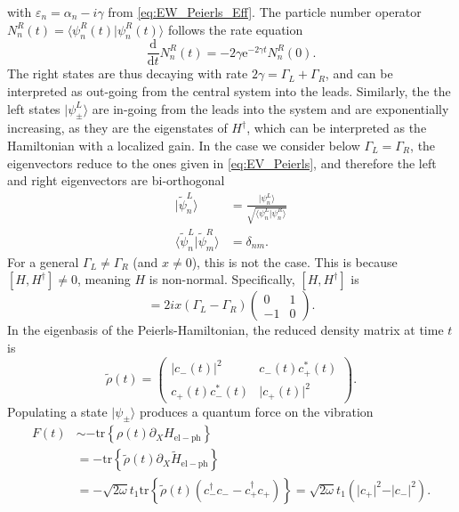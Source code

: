 \documentclass{article}
\newcommand{\exP}[1]{\mathrm{e}^{#1}}
\newcommand{\dif}{\mathrm{d}}
\newcommand{\pdagger}{{\phantom{\dagger}}}
\newcommand{\tr}[1]{\mathrm{tr}\left\{#1\right\}}
\begin{document}
with $\varepsilon_n = \alpha_n -i\gamma$ from \cref{eq:EW_Peierls_Eff}.
The particle number operator $N^R_n(t) = \langle \psi^R_n(t)\vert \psi^R_n(t)\rangle$ follows the rate equation 
\begin{equation}
	\frac{\dif}{\dif t}N^R_n(t) = -2\gamma \exP{-2\gamma t}N^R_n(0).
\end{equation}
The right states are thus decaying with rate $2\gamma = \Gamma_L+\Gamma_R$, and can be interpreted as out-going from the central system into the leads. 
Similarly, the the left states $\vert \psi_\pm^L\rangle$ are in-going from the leads into the system and are exponentially increasing, as they are the eigenstates of $H^\dagger$, which can be interpreted as the Hamiltonian with a localized gain.
In the case we consider below $\Gamma_L = \Gamma_R$, the eigenvectors reduce to the ones given in \cref{eq:EV_Peierls}, and therefore the left and right eigenvectors are bi-orthogonal
\begin{align}
	\vert\tilde{\psi}_n^L\rangle &= \frac{\vert \psi_n^L\rangle}{\sqrt{\langle \psi_n^L\vert\psi_n^R \rangle}}\\
	\langle \tilde{\psi}^L_n\vert  \tilde{\psi}^R_m\rangle &= \delta_{nm}.
\end{align}  
For a general $\Gamma_L\neq \Gamma_R$ (and $x\neq 0$), this is not the case. This is because $[H,H^\dagger]\neq 0$, meaning $H$ is non-normal.
Specifically, $[H,H^\dagger]$ is
\begin{equation}
	[H,H^\dagger] = 2ix (\Gamma_L-\Gamma_R)\begin{pmatrix}
		0  & 1\\
		-1 & 0
	\end{pmatrix}.
\end{equation}
In the eigenbasis of the Peierls-Hamiltonian, the reduced density matrix at time $t$ is
\begin{equation}
	\tilde{\rho}(t) = \begin{pmatrix}
	\vert c_-(t)\vert^2 &  c_-^{\phantom{*}}(t)c_+^*(t) \\
	c_+^{\phantom{*}}(t)c_-^*(t) & \vert c_+(t)\vert^2 
	\end{pmatrix}.
\end{equation}
Populating a state $\vert\psi_\pm\rangle$ produces a quantum force on the vibration
\begin{align}
	F(t) &\sim -\tr{\rho(t)\partial_X H_\mathrm{el-ph}} \\
	&= -\tr{\tilde{\rho}(t)\partial_X \tilde{H}_\mathrm{el-ph}}\\
	&= -\sqrt{2\omega}t_1\tr{\tilde{\rho}(t) (c_-^\dagger c_-^\pdagger - c_+^\dagger c_+^\pdagger)} = \sqrt{2\omega}t_1 (\vert c_+\vert^2 - \vert c_-\vert^2).\\
\end{align}
\end{document}
